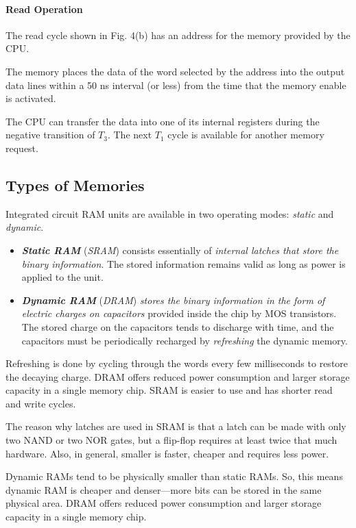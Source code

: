 \paragraph{Read Operation}

The read cycle shown in Fig. 4(b) has an address for the memory provided by the CPU.

The memory places the data of the word selected by the address into the output data lines within a 50 ns interval (or less) from the time that the memory enable is activated.

The CPU can transfer the data into one of its internal registers during the negative transition of $T_3$. The next $T_1$ cycle is available for another memory request.

\subsection{Types of Memories}
\label{subsec:types-of-memories}

Integrated circuit RAM units are available in two operating modes: \textit{static} and \textit{dynamic}. 
\begin{itemize}
  \item \textit{\textbf{Static RAM}} (\textit{SRAM}) consists essentially of \textit{internal latches that store the binary information}. The stored information remains valid as long as power is applied to the unit.
  \item \textit{\textbf{Dynamic RAM}} (\textit{DRAM}) \textit{stores the binary information in the form of electric charges on capacitors} provided inside the chip by MOS transistors. The stored charge on the capacitors tends to discharge with time, and the capacitors must be periodically recharged by \textit{refreshing} the dynamic memory.
\end{itemize}

\vspace*{\fill}
\columnbreak

Refreshing is done by cycling through the words every few milliseconds to restore the decaying charge. DRAM offers reduced power consumption and larger storage capacity in a single memory chip. SRAM is easier to use and has shorter read and write cycles.

The reason why latches are used in SRAM is that a latch can be made with only two NAND or two NOR gates, but a flip-flop requires at least twice that much hardware. Also, in general, smaller is faster, cheaper and requires less power.

Dynamic RAMs tend to be physically smaller than static RAMs. So, this means dynamic RAM is cheaper and denser—more bits can be stored in the same physical area. DRAM offers reduced power consumption and larger storage capacity in a single memory chip.

